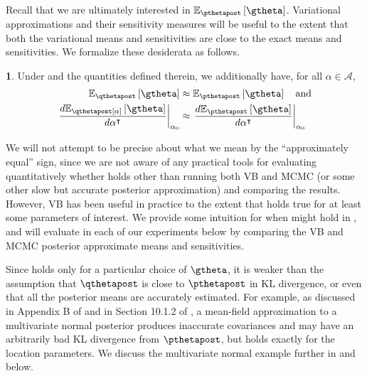 \documentclass{article}\usepackage[]{graphicx}\usepackage[]{color}
\theoremstyle{definition}
\theoremstyle{plain}
\theoremstyle{plain}
\theoremstyle{plain}
\theoremstyle{definition}
\newtheorem{condition}{\protect\conditionname}
\theoremstyle{plain}
\theoremstyle{plain}
\providecommand{\conditionname}{Condition}
\begin{document}
Recall that we are ultimately interested in $\epgtheta$. Variational
approximations and their sensitivity measures will be useful to the
extent that both the variational means and sensitivities are close
to the exact means and sensitivities. We formalize these desiderata as follows.
\begin{condition}
\label{cond:vb_accurate}
Under \vbassum and the quantities defined therein, we additionally have,
for all $\alpha \in \mathcal{A}$,
\begin{align}
\mbe_{\qthetapost}\left[\gtheta\right] &
    \approx\mbe_{\pthetapost}\left[\gtheta\right] \quad \textrm{and}
    \label{eq:vb_accurate}\\
    \left.\frac{d\mbe_{\qthetapost[\alpha]}\left[\gtheta\right]}
        {d\alpha^{\trans}}\right|_{\alpha_{0}} &
        \approx\left.\frac{d\mbe_{\pthetapost}\left[\gtheta\right]}
            {d\alpha^{\trans}}
        \right|_{\alpha_{0}}
    \label{eq:vb_slope_accurate}
\end{align}
\end{condition}
We will not attempt to be precise about what we mean by the ``approximately
equal'' sign, since we are not aware of any practical tools for evaluating
quantitatively whether  holds other than
running both VB and MCMC (or some other slow but accurate posterior
approximation) and comparing the results. However, VB has been useful
in practice to the extent that  holds
true for at least some parameters of interest. We provide some intuition
for when  might hold in
,
and will evaluate  in each of our experiments
below by comparing the VB and MCMC posterior approximate means and
sensitivities.

Since  holds only for a particular choice
of $\gtheta$, it is weaker than the assumption that $\qthetapost$
is close to $\pthetapost$ in KL divergence, or even that all the
posterior means are accurately estimated. For example, as discussed
in Appendix B of \citet{giordano:2015:lrvb} and in Section 10.1.2
of \citet{bishop:2006:pattern}, a mean-field approximation to a multivariate
normal posterior produces inaccurate covariances and may have an arbitrarily
bad KL divergence from $\pthetapost$, but 
holds exactly for the location parameters. We discuss the multivariate
normal example further in  and
 below.
 
\end{document}
